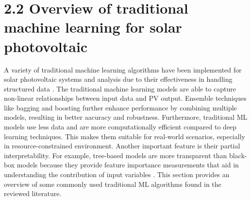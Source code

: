 \section{2.2 Overview of traditional machine learning for solar photovoltaic}
A variety of traditional machine learning algorithms have been implemented for solar photovoltaic systems and analysis due to their effectiveness in handling structured data \parencite{Massidda et al._ 2025}. The traditional machine learning models are able to capture non-linear relationships between input data and PV output. Ensemble techniques like bagging and boosting further enhance performance by combining multiple models, resulting in better aacuracy and robustness. Furthermore, traditional ML models use less data and are more computationally efficient compared to deep learning techniques. This makes them suitable for real-world scenarios, especially in resource-constrained environment. Another important feature is their partial interpretability. For example, tree-based models are more transparent than black-box models because they provide feature importance measurements that aid in understanding the contribution of input variables \parencite{De Silva et al._2024}. This section provides an overview of some commonly used traditional ML algorithms found in the reviewed literature.

